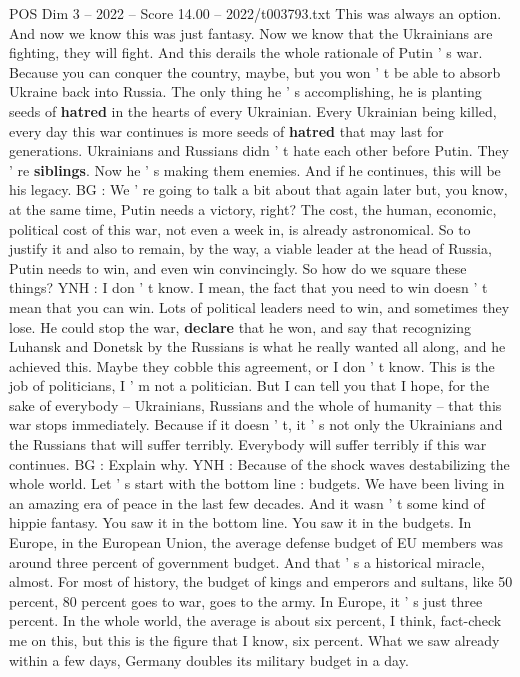 \begin{textsample}{POS Dim 3 – 2022 – Score 14.00 – 2022/t003793.txt}
This was always an option.
And now we know this was just fantasy.
Now we know that the Ukrainians are fighting, they will fight.
And this derails the whole rationale of Putin ' s war.
Because you can conquer the country, maybe, but you won ' t be able to absorb Ukraine back into Russia.
The only thing he ' s accomplishing, he is planting seeds of \textbf{hatred} in the hearts of every Ukrainian.
Every Ukrainian being killed, every day this war continues is more seeds of \textbf{hatred} that may last for generations.
Ukrainians and Russians didn ' t hate each other before Putin.
They ' re \textbf{siblings}.
Now he ' s making them enemies.
And if he continues, this will be his legacy.
BG : We ' re going to talk a bit about that again later but, you know, at the same time, Putin needs a victory, right?
The cost, the human, economic, political cost of this war, not even a week in, is already astronomical.
So to justify it and also to remain, by the way, a viable leader at the head of Russia, Putin needs to win, and even win convincingly.
So how do we square these things?
YNH : I don ' t know.
I mean, the fact that you need to win doesn ' t mean that you can win.
Lots of political leaders need to win, and sometimes they lose.
He could stop the war, \textbf{declare} that he won, and say that recognizing Luhansk and Donetsk by the Russians is what he really wanted all along, and he achieved this.
Maybe they cobble this agreement, or I don ' t know.
This is the job of politicians, I ' m not a politician.
But I can tell you that I hope, for the sake of everybody -- Ukrainians, Russians and the whole of humanity -- that this war stops immediately.
Because if it doesn ' t, it ' s not only the Ukrainians and the Russians that will suffer terribly.
Everybody will suffer terribly if this war continues.
BG : Explain why.
YNH : Because of the shock waves destabilizing the whole world.
Let ' s start with the bottom line : budgets.
We have been living in an amazing era of peace in the last few decades.
And it wasn ' t some kind of hippie fantasy.
You saw it in the bottom line.
You saw it in the budgets.
In Europe, in the European Union, the average defense budget of EU members was around three percent of government budget.
And that ' s a historical miracle, almost.
For most of history, the budget of kings and emperors and sultans, like 50 percent, 80 percent goes to war, goes to the army.
In Europe, it ' s just three percent.
In the whole world, the average is about six percent, I think, fact-check me on this, but this is the figure that I know, six percent.
What we saw already within a few days, Germany doubles its military budget in a day.

\end{textsample}
